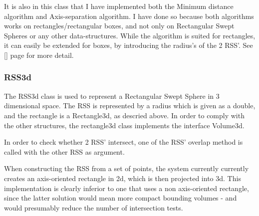 It is also in this class that I have implemented both the Minimum distance algorithm and Axis-separation algorithm. I have done so because both algorithms works on rectangles/rectangular boxes, and not only on Rectangular Swept Spheres or any other data-structures. While the algorithm is suited for rectangles, it can easily be extended for boxes, by introducing the radius's of the 2 RSS'. See \ref{} page \pageref{} for more detail.

\subsubsection{RSS3d}
\label{RSS3d}
The RSS3d class is used to represent a Rectangular Swept Sphere in 3 dimensional space. The RSS is represented by a radius which is given as a double, and the rectangle is a Rectangle3d, as descried above. In order to comply with the other structures, the rectangle3d class implements the interface Volume3d.

In order to check whether 2 RSS' intersect, one of the RSS' overlap method is called with the other RSS as argument.

When constructing the RSS from a set of points, the system currently currently creates an axis-oriented rectangle in 2d, which is then projected into 3d. This implementation is clearly inferior to one that uses a non axis-oriented rectangle, since the latter solution would mean more compact bounding volumes - and would presumably reduce the number of intersection tests.    
